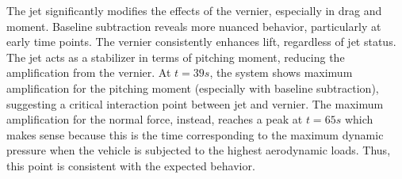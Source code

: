 \documentclass[12pt]{article}
\begin{document}
\begin{center}
\end{center}

The jet significantly modifies the effects of the vernier, especially in drag and moment. Baseline subtraction reveals more nuanced behavior, particularly at early time points. The vernier consistently enhances lift, regardless of jet status. The jet acts as a stabilizer in terms of pitching moment, reducing the amplification from the vernier. At $t=39s$, the system shows maximum amplification for the pitching moment (especially with baseline subtraction), suggesting a critical interaction point between jet and vernier. The maximum amplification for the normal force, instead, reaches a peak at $t=65s$ which makes sense because this is the time corresponding to the maximum dynamic pressure when the vehicle is subjected to the highest aerodynamic loads. Thus, this point is consistent with the expected behavior.

\end{document}
